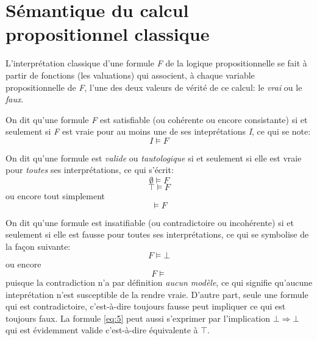 \documentclass[article,reqno,times,12pt,french]{smfart}
\begin{document}
\section{Sémantique du calcul propositionnel classique}
\label{sec:orgae6fb7a}
\begin{defi}
 L'interprétation classique d'une formule
\emph{F} de la logique propositionnelle se  fait à partir de fonctions (les
valuations) qui associent, à  chaque variable propositionnelle de \emph{F},
l'une des deux valeurs de vérité de ce calcul: le \emph{vrai} ou le \emph{faux}.  
\end{defi}
\begin{defi}
[Satisfiabilité]  On  dit qu'une  formule  \emph{F}  est \og satisfiable\fg{}  (ou
\og cohérente\fg{} ou encore \og consistante\fg{}) si  et seulement si \emph{F} est vraie
pour au moins une de ses inteprétations \emph{I}, ce qui se note:
\begin{equation}
\label{eq:1}
I \models F
\end{equation}
\end{defi}
\begin{defi}
[Validité] 
On dit qu'une  formule est \emph{valide} ou \emph{tautologique}  si et seulement
si elle est vraie pour \emph{toutes} ses interprétations, ce qui s'écrit: 
\begin{equation}
\label{eq:2}
\emptyset \models F
\end{equation}
\begin{equation}
\label{eq:3}
\top \models F
\end{equation}
ou encore tout simplement
\begin{equation}
\label{eq:4}
\models F
\end{equation}
\end{defi}
\begin{defi}
[Insatisfiabilité] 
On  dit  qu'une formule  est  \og insatifiable\fg{}  (ou \og contradictoire\fg{}  ou
\og incohérente\fg{})  si et  seulement si  elle est  fausse pour  toutes ses
interprétations, ce qui se symbolise de la façon suivante:
\begin{equation}
\label{eq:5}
F \models \bot
\end{equation}
ou encore 
\begin{equation}
\label{eq:6}
F \models 
\end{equation}
puisque   la  contradiction   n'a  par   définition  \emph{aucun   modèle},
ce qui signifie qu'aucune inteprétation n'est susceptible de la rendre
vraie.  D'autre  part,  seule  une  formule  qui  est  contradictoire,
c'est-à-dire toujours fausse peut impliquer  ce qui est toujours faux.
La formule  \eqref{eq:5} peut aussi s'exprimer  par l'implication \(\bot
\Rightarrow \bot\) qui est  évidemment valide c'est-à-dire équivalente
à \(\top\).  
\end{defi}
\end{document}
